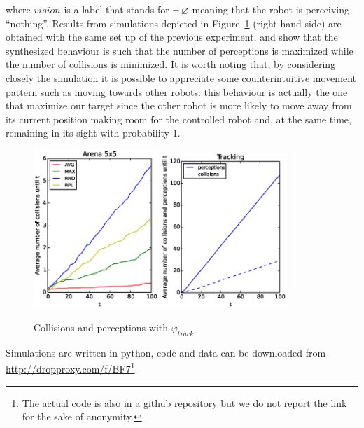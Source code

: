 \vspace{-.2cm}
\noindent
where $vision$ is a label that stands for $\neg\ \varnothing$ meaning that the robot is perceiving ``nothing''. 
Results from simulations depicted in Figure~\ref{fig:exp} (right-hand side) are obtained with the same set up of the previous experiment, and show that the synthesized behaviour is such that the number of perceptions is maximized while the number of collisions is minimized. 
It is worth noting that, by considering closely the simulation it is possible to appreciate some counterintuitive movement pattern such as moving towards other robots:
this behaviour is actually the one that maximize our target since the other robot is more likely to move away from its current position making room for the controlled robot and, at the same time, remaining in its sight with probability $1$.
\begin{figure}[htbp]
	\centering
	\includegraphics[width=0.42\textwidth]{figures/avoid_C0D5N3.eps}
	\includegraphics[width=0.42\textwidth]{figures/track_S0N3.eps}
	\caption{Collisions and perceptions with $\varphi_{track}$}
	\label{fig:exp}
\end{figure}

Simulations are written in python, code and data can be downloaded from  \url{http://dropproxy.com/f/BF7}\footnote{The actual code is also in a github repository but we do not report the link for the sake of anonymity.}.%
